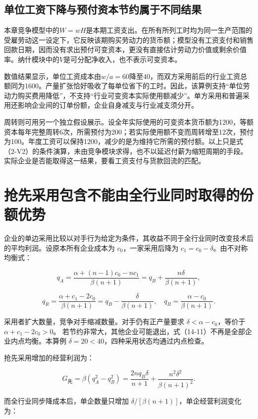 \documentclass[UTF8,fontset=windows,12pt,a4paper,oneside,openany]{ctexbook}
\begin{document}
\subsection{单位工资下降与预付资本节约属于不同结果}

本章竞争模型中的$W=wH$是本期工资支出。在所有所列工时均为同一生产范围的受雇劳动这一设定下，它反映该期购买劳动力的货币额；模型没有工资支付和销售回款日期，因而没有求出预付可变资本，更没有直接估计劳动力价值或剩余价值率。纳什模块中的$V$是可分配净收入，也不表示可变资本。

数值结果显示，单位工资成本由$w/a=60$降至40，而双方采用前后的行业工资总额同为1600。产量扩张恰好吸收了每单位省下的工时。因此，该算例支持“单位劳动力购买费用降低”，不支持“行业可变资本实际使用额减少”。单方采用和普遍采用还影响企业间的订单份额，企业自身减支与行业减支须分开。

周转则可用另一个独立假设展示。设全年实际使用的可变资本货币额为1200，等额资本每年完整周转6次，所需预付为200；若实际使用额不变而周转增至12次，预付为100。年度工资可以保持1200，减少的是为维持它所需的预付额。以上只是式（2-V2）的条件演算，未由竞争模块求得，也不以延迟付薪为缩短周期的手段。实际企业是否能取得这一结果，要看工资支付与货款回流的匹配。

\section{抢先采用包含不能由全行业同时取得的份额优势}

企业的单边采用比较以对手行为给定为条件，其收益不同于全行业同时改变技术后的平均利润。设原本所有企业成本为 \(c_0\)，一家采用后降为 \(c_1=c_0-\delta\)。由不对称均衡式：

\[
q_A=\frac{\alpha+(n-1)c_0-nc_1}{\beta(n+1)}
=q_B+\frac{n\delta}{\beta(n+1)},
\]

\[
q_R=\frac{\alpha+c_1-2c_0}{\beta(n+1)}
=q_B-\frac{\delta}{\beta(n+1)},
\quad q_B=\frac{\alpha-c_0}{\beta(n+1)}.
\tag{14-11}
\]

采用者扩大数量，竞争对手缩减数量。对手仍有正产量要求
\(\delta<\alpha-c_0\)，等价于 \(\alpha+c_1-2c_0>0\)。
若节约非常大，其他企业可能退出，式（14-11）不再是全部企业内点均衡。本算例 \(\delta=20<40\)，四种采用状态均通过内点检查。

抢先采用增加的经营利润为：

\[
G_{\text{先}}=\beta(q_A^2-q_B^2)
=\frac{2nq_B\delta}{n+1}
+\frac{n^2\delta^2}{\beta(n+1)^2}.
\tag{14-12}
\]

而全行业同步降成本后，单企数量只增加
\(\delta/[\beta(n+1)]\)，单企经营利润变化为：
\end{document}
